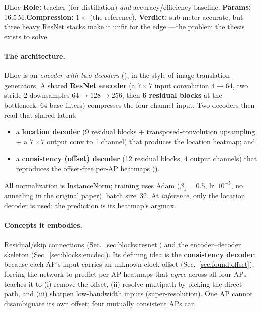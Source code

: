 \begin{ataglance}{DLoc}
\textbf{Role:} teacher (for distillation) \emph{and} accuracy/efficiency baseline.\quad
\textbf{Params:} 16.5\,M.\quad \textbf{Compression:} $1\times$ (the reference).\quad
\textbf{Verdict:} sub-meter accurate, but three heavy ResNet stacks make it unfit for the edge ---the
problem the thesis exists to solve.
\end{ataglance}

\paragraph{The architecture.} DLoc is an \emph{encoder with two decoders} (),
in the style of image-translation generators. A shared \textbf{ResNet encoder} (a $7\times7$ input
convolution $4\to64$, two stride-2 downsamples $64\to128\to256$, then \textbf{6 residual blocks} at
the bottleneck, $64$ base filters) compresses the four-channel input. Two decoders then read that
shared latent:
\begin{itemize}[leftmargin=1.4em,nosep]
  \item a \textbf{location decoder} (9 residual blocks $+$ transposed-convolution upsampling $+$ a
  $7\times7$ output conv to 1 channel) that produces the location heatmap; and
  \item a \textbf{consistency (offset) decoder} (12 residual blocks, 4 output channels) that
  reproduces the offset-free per-AP heatmaps ().
\end{itemize}
All normalization is InstanceNorm; training uses Adam ($\beta_1{=}0.5$, lr~$10^{-5}$, no annealing in
the original paper), batch size~32. At \emph{inference}, only the location decoder is used: the
prediction is its heatmap's argmax.

\paragraph{Concepts it embodies.} Residual/skip connections (Sec.~\ref{sec:blocks:resnet}) and the
encoder--decoder skeleton (Sec.~\ref{sec:blocks:encdec}). Its defining idea is the
\textbf{consistency decoder}: because each AP's input carries an unknown clock offset
(Sec.~\ref{sec:found:offset}), forcing the network to predict per-AP heatmaps that \emph{agree} across
all four APs teaches it to (i) remove the offset, (ii) resolve multipath by picking the direct path,
and (iii) sharpen low-bandwidth inputs (super-resolution). One AP cannot disambiguate its own offset;
four mutually consistent APs can.

